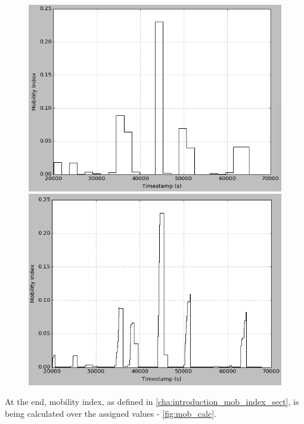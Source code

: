 \begin{figure}
	\centering
	\begin{minipage}{.5\textwidth}
		\centering
		\includegraphics[width=.9\linewidth]{images/mob_calc1.png}
	\end{minipage}%
	\begin{minipage}{.5\textwidth}
		\centering
		\includegraphics[width=.9\linewidth]{images/mob_calc2.png}
	\end{minipage}
	\label{fig:mob_calc}
\end{figure}

\FloatBarrier

At the end, mobility index, as defined in \autoref{cha:introduction_mob_index_sect}, is being calculated over the assigned values - \autoref{fig:mob_calc}. 

